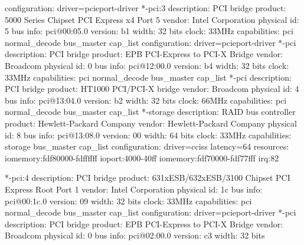 \documentclass[mingoth,a4paper]{jsarticle}
\begin{document}
{{{{{{{{{{{{{{{{{{\begin{commandline}
             configuration: driver=pcieport-driver
        *-pci:3
             description: PCI bridge
             product: 5000 Series Chipset PCI Express x4 Port 5
             vendor: Intel Corporation
             physical id: 5
             bus info: pci@00:05.0
             version: b1
             width: 32 bits
             clock: 33MHz
             capabilities: pci normal_decode bus_master cap_list
             configuration: driver=pcieport-driver
           *-pci
                description: PCI bridge
                product: EPB PCI-Express to PCI-X Bridge
                vendor: Broadcom
                physical id: 0
                bus info: pci@12:00.0
                version: b4
                width: 32 bits
                clock: 33MHz
                capabilities: pci normal_decode bus_master cap_list
              *-pci
                   description: PCI bridge
                   product: HT1000 PCI/PCI-X bridge
                   vendor: Broadcom
                   physical id: 4
                   bus info: pci@13:04.0
                   version: b2
                   width: 32 bits
                   clock: 66MHz
                   capabilities: pci normal_decode bus_master cap_list
              *-storage
                   description: RAID bus controller
                   product: Hewlett-Packard Company
                   vendor: Hewlett-Packard Company
                   physical id: 8
                   bus info: pci@13:08.0
                   version: 00
                   width: 64 bits
                   clock: 33MHz
                   capabilities: storage bus_master cap_list
                   configuration: driver=cciss latency=64
                   resources: iomemory:fdf80000-fdffffff ioport:4000-40ff iomemory:fdf70000-fdf77fff irq:82
\end{commandline}
\begin{commandline}
        *-pci:4
             description: PCI bridge
             product: 631xESB/632xESB/3100 Chipset PCI Express Root Port 1
             vendor: Intel Corporation
             physical id: 1c
             bus info: pci@00:1c.0
             version: 09
             width: 32 bits
             clock: 33MHz
             capabilities: pci normal_decode bus_master cap_list
             configuration: driver=pcieport-driver
           *-pci
                description: PCI bridge
                product: EPB PCI-Express to PCI-X Bridge
                vendor: Broadcom
                physical id: 0
                bus info: pci@02:00.0
                version: c3
                width: 32 bits

\end{commandline}}}}}}}}}}}}}}}}}}}
\end{document}
